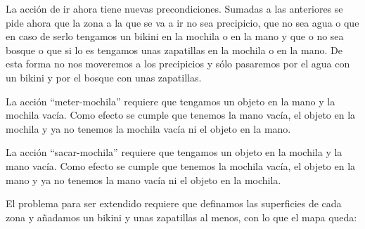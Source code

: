 \documentclass[12pt,a4paper]{article}
\begin{document}
La acción de ir ahora tiene nuevas precondiciones. Sumadas a las anteriores se pide ahora que la zona a la que se va a ir no sea precipicio, que no sea agua o que en caso de serlo tengamos un bikini en la mochila o en la mano y que o no sea bosque o que si lo es tengamos unas zapatillas en la mochila o en la mano. De esta forma no nos moveremos a los precipicios y sólo pasaremos por el agua con un bikini y por el bosque con unas zapatillas.

La acción ``meter-mochila'' requiere que tengamos un objeto en la mano y la mochila vacía. Como efecto se cumple que tenemos la mano vacía, el objeto en la mochila y ya no tenemos la mochila vacía ni el objeto en la mano.

La acción ``sacar-mochila'' requiere que tengamos un objeto en la mochila y la mano vacía. Como efecto se cumple que tenemos la mochila vacía, el objeto en la mano y ya no tenemos la mano vacía ni el objeto en la mochila.

El problema para ser extendido requiere que definamos las superficies de cada zona y añadamos un bikini y unas zapatillas al menos, con lo que el mapa queda:

\end{document}
